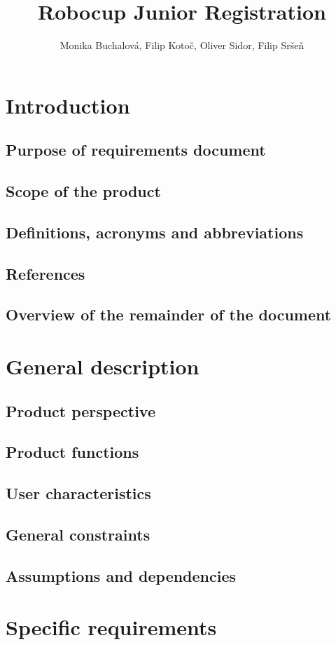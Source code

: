 \documentclass[a4paper]{article}
\title{Robocup Junior Registration}
\author{Monika Buchalová, Filip Kotoč, Oliver Sidor, Filip Sršeň}
\begin{document}
	\maketitle
	
	\tableofcontents
	\newpage
	\section{Introduction}
	\label{sec:Intro}
	\subsection{Purpose of requirements document}
	\label{sub:purpose}
	\subsection{Scope of the product}
	\label{sub:scope}
	\subsection{Definitions, acronyms and abbreviations}
	\label{sub:definitios}
	\subsection{References}
	\label{sub:references}
	\subsection{Overview of the remainder of the document}
	\label{sub:overview}
	
	\newpage
	
	\section{General description}
	\label{sec:general-desc}
	\subsection{Product perspective}
	\label{sub:perspective}
	\subsection{Product functions}
	\label{sub:functions}
	\subsection{User characteristics}
	\label{sub:users}
	\subsection{General constraints}
	\label{sub:constraints}
	\subsection{Assumptions and dependencies}
	\label{sub:dependencies}
	
	\newpage
	
	\section{Specific requirements}
	\label{sec:specific}
\end{document}
